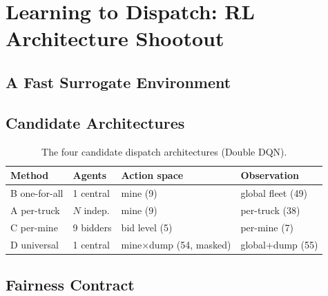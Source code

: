 \section{Learning to Dispatch: RL Architecture Shootout}

\subsection{A Fast Surrogate Environment}

\subsection{Candidate Architectures}
\begin{table}[t]
  \centering
  \caption{The four candidate dispatch architectures (Double DQN).}
  \label{tab:architectures}
  \begin{tabular}{llll}
    \toprule
    Method & Agents & Action space & Observation \\
    \midrule
    B one-for-all & 1 central  & mine (9)          & global fleet (49) \\
    A per-truck   & $N$ indep. & mine (9)          & per-truck (38)    \\
    C per-mine    & 9 bidders  & bid level (5)     & per-mine (7)      \\
    D universal   & 1 central  & mine$\times$dump (54, masked) & global+dump (55) \\
    \bottomrule
  \end{tabular}
\end{table}

\subsection{Fairness Contract}

